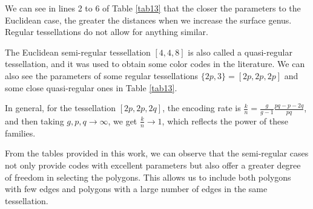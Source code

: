 \documentclass[%
reprint,
amsmath,amssymb,
aps,
]{revtex4-2}
\begin{document}
	We can see in lines 2 to 6 of Table \ref{tab13} that the closer the parameters to the Euclidean case, the greater the distances when we increase the surface genus. Regular tessellations do not allow for anything similar.
	
	The Euclidean semi-regular tessellation $[4,4,8]$ is also called a quasi-regular tessellation, and it was used to obtain some color codes in the literature. We can also see the parameters of some regular tessellations $\{2p,3\} = [2p,2p,2p]$ and some close quasi-regular ones in Table \ref{tab13}. 
	
	In general, for the tessellation $[2p,2p,2q]$, the encoding rate is $\frac{k}{n} = \frac{g}{g-1}\frac{pq - p - 2q}{pq}$, and then taking $g, p, q \rightarrow \infty$, we get $\frac{k}{n} \rightarrow 1$, which reflects the power of these families.
	
	From the tables provided in this work, we can observe that the semi-regular cases not only provide codes with excellent parameters but also offer a greater degree of freedom in selecting the polygons. This allows us to include both polygons with few edges and polygons with a large number of edges in the same tessellation.
	
\end{document}
